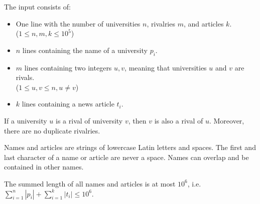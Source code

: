 
The input consists of:
\begin{itemize}
    \item One line with the number of universities $n$, rivalries $m$, and articles $k$. \\
    ($1\leq n,m,k\leq 10^5$)
    \item $n$ lines containing the name of a university $p_i$.
    \item $m$ lines containing two integers $u,v$, meaning that universities $u$ and $v$ are rivals. \\
    ($1\leq u,v \leq n, u\neq v$)
    \item $k$ lines containing a news article $t_i$.
\end{itemize}

If a university $u$ is a rival of university $v$, then $v$ is also a rival of $u$. Moreover, there are no duplicate rivalries.

Names and articles are strings of lowercase Latin letters and spaces.
The first and last character of a name or article are never a space.
Names can overlap and be contained in other names.

The summed length of all names and articles is at most $10^6$, i.e. $\sum_{i=1}^{n} |p_i| + \sum_{i=1}^{k} |t_i| \leq 10^6$.

